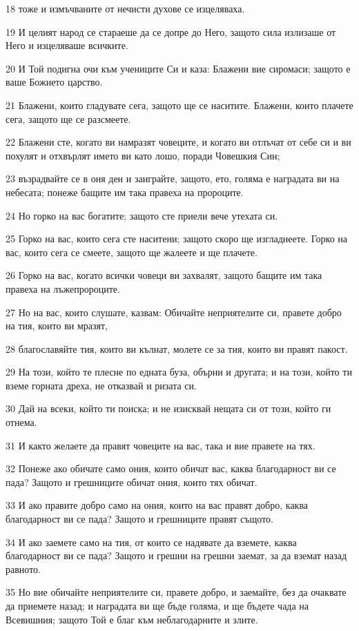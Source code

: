 \par 18 тоже и измъчваните от нечисти духове се изцеляваха.
\par 19 И целият народ се стараеше да се допре до Него, защото сила излизаше от Него и изцеляваше всичките.
\par 20 И Той подигна очи към учениците Си и каза: Блажени вие сиромаси; защото е ваше Божието царство.
\par 21 Блажени, които гладувате сега, защото ще се наситите. Блажени, които плачете сега, защото ще се разсмеете.
\par 22 Блажени сте, когато ви намразят човеците, и когато ви отлъчат от себе си и ви похулят и отхвърлят името ви като лошо, поради Човешкия Син;
\par 23 възрадвайте се в оня ден и заиграйте, защото, ето, голяма е наградата ви на небесата; понеже бащите им така правеха на пророците.
\par 24 Но горко на вас богатите; защото сте приели вече утехата си.
\par 25 Горко на вас, които сега сте наситени; защото скоро ще изгладнеете. Горко на вас, които сега се смеете, защото ще жалеете и ще плачете.
\par 26 Горко на вас, когато всички човеци ви захвалят, защото бащите им така правеха на лъжепророците.
\par 27 Но на вас, които слушате, казвам: Обичайте неприятелите си, правете добро на тия, които ви мразят,
\par 28 благославяйте тия, които ви кълнат, молете се за тия, които ви правят пакост.
\par 29 На този, който те плесне по едната буза, обърни и другата; и на този, който ти вземе горната дреха, не отказвай и ризата си.
\par 30 Дай на всеки, който ти поиска; и не изисквай нещата си от този, който ги отнема.
\par 31 И както желаете да правят човеците на вас, така и вие правете на тях.
\par 32 Понеже ако обичате само ония, които обичат вас, каква благодарност ви се пада? Защото и грешниците обичат ония, които тях обичат.
\par 33 И ако правите добро само на ония, които на вас правят добро, каква благодарност ви се пада? Защото и грешниците правят същото.
\par 34 И ако заемете само на тия, от които се надявате да вземете, каква благодарност ви се пада? Защото и грешни на грешни заемат, за да вземат назад равното.
\par 35 Но вие обичайте неприятелите си, правете добро, и заемайте, без да очаквате да приемете назад; и наградата ви ще бъде голяма, и ще бъдете чада на Всевишния; защото Той е благ към неблагодарните и злите.
